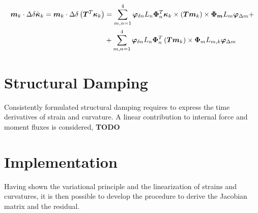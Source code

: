 \begin{equation}
\begin{split}
\bm{m}_k \cdot \Delta \delta \tilde{\bm{\kappa}}_k =
\bm{m}_k \cdot \Delta \delta \left( \bm{T}^T \bm{\kappa}_k \right) & =
\sum_{m,n=1}^{4} \bm{\varphi}_{\delta n} L_n \bm{\Phi}_n^T \bm{\kappa}_k \times \left( \bm{T} \bm{m}_k \right) \times \bm{\Phi_{m}} L_m \bm{\varphi}_{\Delta m} + \\
&+\sum_{m,n=1}^{4} \bm{\varphi}_{\delta n} L_n \bm{\Phi}_n^T \left( \bm{T} \bm{m}_k \right) \times \bm{\Phi}_m L_{m,k} \bm{\varphi}_{\Delta m}
\end{split}
\label{eq:Deltadelta_k}
\end{equation}
\section{Structural Damping}
Consistently formulated structural damping requires to express
the time derivatives of strain and curvature.
A linear contribution to internal force and moment fluxes is considered,
\textbf{TODO}
\section{Implementation}
Having shown the variational principle and the linearization of strains and curvatures, it is then possible to develop the procedure to derive the Jacobian matrix and the residual.
